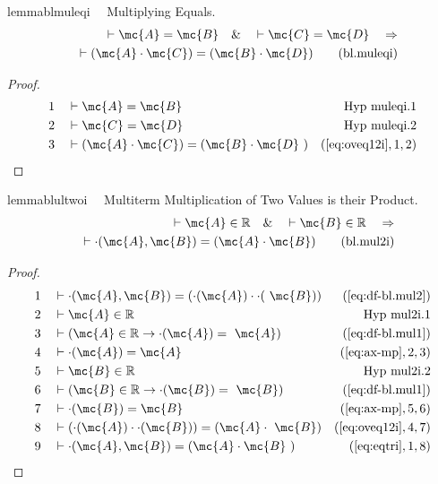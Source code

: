 \begin{restatable}{lemma}{blmuleqi}~~ Multiplying Equals.
\begin{align}
\vdash \mc{A} = \mc{B}\quad\&\quad \vdash \mc{C} = \mc{D}\quad\Rightarrow \notag \\ 
	\quad
    \vdash ( \mc{A} \cdot \mc{C} ) = ( \mc{B} \cdot \mc{D}
    )\label{eq:bl.muleqi}\tag{bl.muleqi}
\end{align}
\end{restatable}

\begin{proof}
\begin{align}
  1 &&  & \vdash \mc{A} = \mc{B}&\text{Hyp~muleqi.1}\notag%
  \\ 2 &&  & \vdash \mc{C} = \mc{D}&\text{Hyp~muleqi.2}\notag%
  \\ 3 &&  & \vdash ( \mc{A} \cdot \mc{C} ) = ( \mc{B} \cdot \mc{D}
     ~)&(\mbox{\ref{eq:oveq12i}},1,2)\notag
\end{align}
\end{proof}

\begin{restatable}{lemma}{blultwoi}~~ Multiterm Multiplication of Two Values is
their Product.
\begin{align}
\vdash \mc{A} \in \mathbb{R}\quad\&\quad \vdash \mc{B} \in
    \mathbb{R}\quad\Rightarrow \notag \\ 
	\quad \vdash \cdot( \mc{A} , \mc{B} ) = ( \mc{A}
    \cdot \mc{B} )\label{eq:bl.mul2i}\tag{bl.mul2i}
\end{align}
\end{restatable}

\begin{proof}
\begin{align}
  1 &&  & \vdash \cdot( \mc{A} , \mc{B} ) = ( \cdot( \mc{A} ) \cdot \cdot(
     ~\mc{B} ) )&(\mbox{\ref{eq:df-bl.mul2}})\notag
  \\ 2 &&  & \vdash \mc{A} \in \mathbb{R}&\text{Hyp~mul2i.1}\notag%
  \\ 3 &&  & \vdash ( \mc{A} \in \mathbb{R} \rightarrow \cdot( \mc{A} ) =
     ~\mc{A} )&(\mbox{\ref{eq:df-bl.mul1}})\notag
  \\ 4 &&  & \vdash \cdot( \mc{A} ) = \mc{A}&(\mbox{\ref{eq:ax-mp}},2,3)\notag
  \\ 5 &&  & \vdash \mc{B} \in \mathbb{R}&\text{Hyp~mul2i.2}\notag%
  \\ 6 &&  & \vdash ( \mc{B} \in \mathbb{R} \rightarrow \cdot( \mc{B} ) =
     ~\mc{B} )&(\mbox{\ref{eq:df-bl.mul1}})\notag
  \\ 7 &&  & \vdash \cdot( \mc{B} ) = \mc{B}&(\mbox{\ref{eq:ax-mp}},5,6)\notag
  \\ 8 &&  & \vdash ( \cdot( \mc{A} ) \cdot \cdot( \mc{B} ) ) = ( \mc{A} \cdot
     ~\mc{B} )&(\mbox{\ref{eq:oveq12i}},4,7)\notag
  \\ 9 &&  & \vdash \cdot( \mc{A} , \mc{B} ) = ( \mc{A} \cdot \mc{B}
     ~)&(\mbox{\ref{eq:eqtri}},1,8)\notag
\end{align}
\end{proof}

